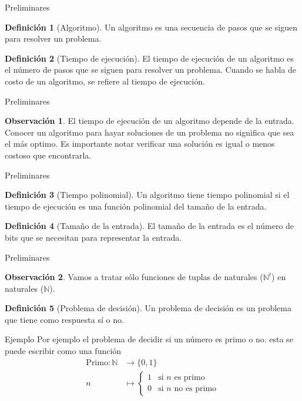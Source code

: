 \documentclass[dvipsnames, 11pt]{beamer}
\theoremstyle{plain}
\newcommand{\N}{\mathbb{N}}
\theoremstyle{definition}
\newtheorem{defi}{Definición}
\newtheorem{obs}{Observación}
\begin{document}
\begin{frame}{Preliminares}
    \begin{defi}[Algoritmo]
        Un algoritmo es una secuencia de pasos que se siguen para resolver un problema.
    \end{defi}
    \pause
    \begin{defi}[Tiempo de ejecución]
        El tiempo de ejecución de un algoritmo es el número de pasos que se siguen para resolver un problema. Cuando se habla de costo de un algoritmo, se refiere al tiempo de ejecución.
    \end{defi}
\end{frame}
\begin{frame}{Preliminares}
    \begin{obs}
        El tiempo de ejecución de un algoritmo depende de la entrada. Conocer un algoritmo para hayar soluciones de un problema no significa que sea el más optimo. Es importante notar verificar una solución es igual o menos costoso que encontrarla.
    \end{obs}
\end{frame}

\begin{frame}{Preliminares}
    \begin{defi}[Tiempo polinomial]
        Un algoritmo tiene tiempo polinomial si el tiempo de ejecución es una función polinomial del tamaño de la entrada.
    \end{defi}
    \pause
    \begin{defi}[Tamaño de la entrada]
        El tamaño de la entrada es el número de bits que se necesitan para representar la entrada.
    \end{defi}
\end{frame}

\begin{frame}{Preliminares}
    \begin{obs}
        Vamos a tratar sólo funciones de tuplas de naturales ($\N^{t}$) en naturales ($\N$).
    \end{obs}
    \pause
    \begin{defi}[Problema de decisión]
        Un problema de decisión es un problema que tiene como respuesta sí o no.
    \end{defi}
\end{frame}

\begin{frame}{Ejemplo}
    Por ejemplo el problema de decidir si un número es primo o no. esta se puede escribir como una función\pause
    \begin{equation*}
        \begin{split}
            \text{Primo}:\N &\longrightarrow \{0,1\}\\
            n &\longmapsto \begin{cases}
                1 & \text{si $n$ es primo}\\
                0 & \text{si $n$ no es primo}
            \end{cases}
        \end{split}
    \end{equation*}
\end{frame}
\end{document}
